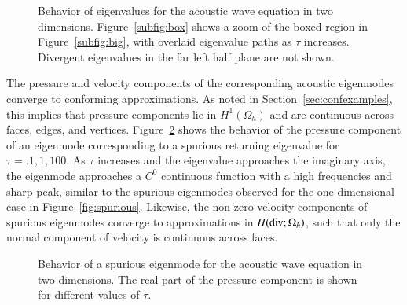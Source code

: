 \documentclass[preprint,10pt]{elsarticle}
\newcommand{\Oh}{\Omega_h}
\begin{document}
\begin{figure}
\centering
{}
\hspace{3em}
\caption{Behavior of eigenvalues for the acoustic wave equation in two dimensions.  Figure~\ref{subfig:box} shows a zoom of the boxed region in Figure~\ref{subfig:big}, with overlaid eigenvalue paths as $\tau$ increases.  Divergent eigenvalues in the far left half plane are not shown.  }
\label{fig:trackEigsWave}
\end{figure}

The pressure and velocity components of the corresponding acoustic eigenmodes converge to conforming approximations.  As noted in Section~\ref{sec:confexamples}, this implies that pressure components lie in $H^1(\Oh)$ and are continuous across faces, edges, and vertices.  Figure~\ref{fig:trackModesWave} shows the behavior of the pressure component of an eigenmode corresponding to a spurious returning eigenvalue for $\tau = .1, 1, 100$.  As $\tau$ increases and the eigenvalue approaches the imaginary axis, the eigenmode approaches a $C^0$ continuous function with a high frequencies and sharp peak, similar to the spurious eigenmodes observed for the one-dimensional case in Figure~\ref{fig:spurious}.  Likewise, the non-zero velocity components of spurious eigenmodes converge to approximations in $H({\rm div}; \Oh)$, such that only the normal component of velocity is continuous across faces.  



\begin{figure}
\centering
{}
\hspace{.5em}
\hspace{.5em}
\caption{Behavior of a spurious eigenmode for the acoustic wave equation in two dimensions.  The real part of the pressure component is shown for different values of $\tau$.}
\label{fig:trackModesWave}
\end{figure}
\end{document}
